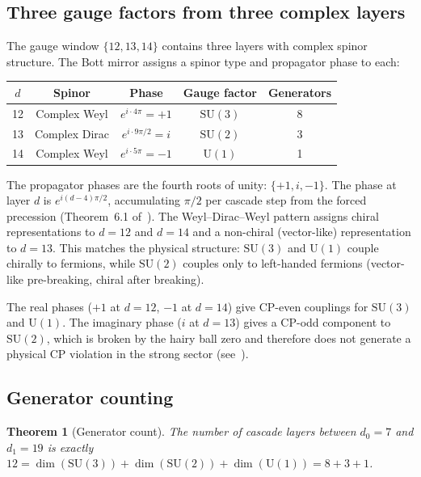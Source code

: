 \documentclass[12pt,a4paper]{article}
\newtheorem{theorem}{Theorem}[section]
\begin{document}
\subsection{Three gauge factors from three complex layers}

The gauge window $\{12,13,14\}$ contains three layers with complex spinor structure. The
Bott mirror assigns a spinor type and propagator phase to each:

\begin{center}
\begin{tabular}{ccccc}
\toprule
$d$ & Spinor & Phase & Gauge factor & Generators \\
\midrule
12 & Complex Weyl  & $e^{i\cdot 4\pi}=+1$ & $\mathrm{SU}(3)$ & 8 \\
13 & Complex Dirac & $e^{i\cdot 9\pi/2}=i$ & $\mathrm{SU}(2)$ & 3 \\
14 & Complex Weyl  & $e^{i\cdot 5\pi}=-1$  & $\mathrm{U}(1)$  & 1 \\
\bottomrule
\end{tabular}
\end{center}

The propagator phases are the fourth roots of unity: $\{+1,i,-1\}$. The phase at layer $d$
is $e^{i(d-4)\pi/2}$, accumulating $\pi/2$ per cascade step from the forced precession
(Theorem~6.1 of~\cite{paperII}). The Weyl--Dirac--Weyl pattern assigns chiral
representations to $d=12$ and $d=14$ and a non-chiral (vector-like) representation to
$d=13$. This matches the physical structure: $\mathrm{SU}(3)$ and $\mathrm{U}(1)$ couple
chirally to fermions, while $\mathrm{SU}(2)$ couples only to left-handed fermions
(vector-like pre-breaking, chiral after breaking).

The real phases ($+1$ at $d=12$, $-1$ at $d=14$) give CP-even couplings for $\mathrm{SU}(3)$
and $\mathrm{U}(1)$. The imaginary phase ($i$ at $d=13$) gives a CP-odd component to
$\mathrm{SU}(2)$, which is broken by the hairy ball zero and therefore does not generate a
physical CP violation in the strong sector (see~\cite{paperIVb}).

\subsection{Generator counting}

\begin{theorem}[Generator count]\label{thm:generators}
The number of cascade layers between $d_0=7$ and $d_1=19$ is exactly
$12=\dim(\mathrm{SU}(3))+\dim(\mathrm{SU}(2))+\dim(\mathrm{U}(1))=8+3+1$.
\end{theorem}
\end{document}

